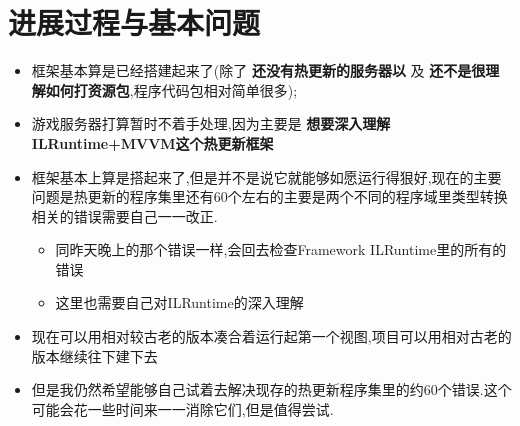 \documentclass[9pt, b5paper]{article}
\begin{document}
\section{进展过程与基本问题}
\label{sec-3}
\begin{itemize}
\item 框架基本算是已经搭建起来了(除了 \textbf{还没有热更新的服务器以} 及 \textbf{还不是很理解如何打资源包},程序代码包相对简单很多);
\item 游戏服务器打算暂时不着手处理,因为主要是 \textbf{想要深入理解ILRuntime+MVVM这个热更新框架}
\item 框架基本上算是搭起来了,但是并不是说它就能够如愿运行得狠好,现在的主要问题是热更新的程序集里还有60个左右的主要是两个不同的程序域里类型转换相关的错误需要自己一一改正.
\begin{itemize}
\item 同昨天晚上的那个错误一样,会回去检查Framework ILRuntime里的所有的错误
\item 这里也需要自己对ILRuntime的深入理解
\end{itemize}
\item 现在可以用相对较古老的版本凑合着运行起第一个视图,项目可以用相对古老的版本继续往下建下去
\item 但是我仍然希望能够自己试着去解决现存的热更新程序集里的约60个错误.这个可能会花一些时间来一一消除它们,但是值得尝试.
\end{itemize}
\end{document}
